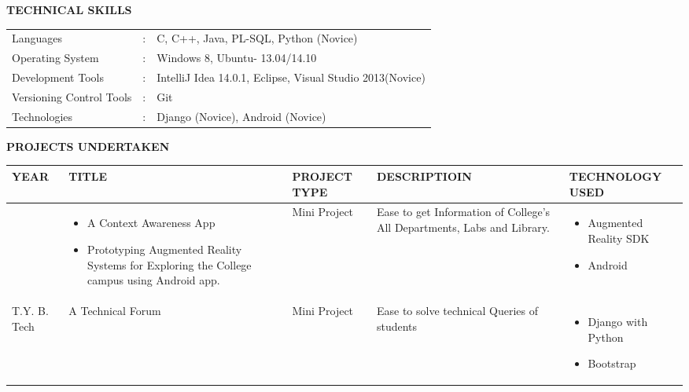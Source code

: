 \documentclass{article}
\begin{document}
\vspace{1cm}
\begin{framed}
	\large{\textbf{TECHNICAL SKILLS}}
\end{framed}
\setlength{\tabcolsep}{0.7em}
\def\arraystretch{1.7}
\begin{tabular}{lcl}
	Languages & : & C, C++, Java, PL-SQL, Python (Novice)\\
	Operating System &  : &  Windows 8, Ubuntu- 13.04/14.10\\
	Development Tools &  : & IntelliJ Idea 14.0.1, Eclipse, Visual Studio 2013(Novice)\\
	Versioning Control Tools & : & Git\\
	Technologies &  : &  Django (Novice), Android (Novice)  
\end{tabular}

\vspace{1cm}
\begin{framed}
	\large{\textbf{PROJECTS UNDERTAKEN}}
\end{framed}
\setlength{\tabcolsep}{0.1em}
\def\arraystretch{1.7}
\begin{center}
\begin{tabularx}{\linewidth}{|X|X|X|X|X|}
	\hline
	\centering\textbf{YEAR} & \centering\textbf{ TITLE} & \centering\textbf{PROJECT TYPE} & \centering\textbf{DESCRIPTIOIN} & \textbf{TECHNOLOGY USED}\\
\hline

	\centering{ T.Y. B. Tech} & 
	\centering 
		\begin{itemize}
				\item A Context Awareness App
				\item Prototyping Augmented Reality Systems for Exploring the College campus using Android app.
		\end{itemize}
 	&
	\centering Mini Project&
	\centering Ease to get Information of College's All Departments, Labs and Library. 
	&
	\begin{itemize}
		\item Augmented Reality SDK
		\item Android
	\end{itemize}\\
	\hline
	
	\centering T.Y. B. Tech & 
	A Technical Forum  & Mini Project & Ease to solve technical Queries of students &
	\begin{itemize}	
		\item Django with Python
		\item Bootstrap
	\end{itemize} \\
	\hline
\end{tabularx}
\end{center}
\end{document}
